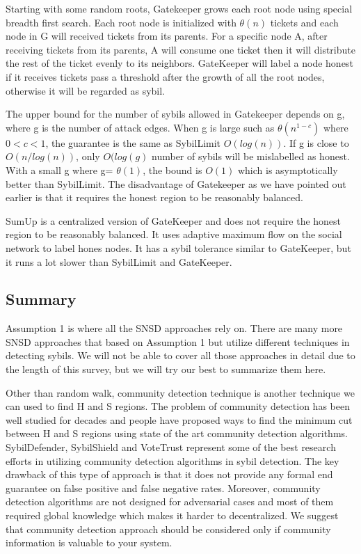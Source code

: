 \documentclass[conference]{IEEEtran}
\begin{document}
Starting with some random roots, Gatekeeper grows each root node using special breadth first search. Each root node is initialized with $\theta(n)$ tickets and each node in G will received tickets from its parents. For a specific node A, after receiving tickets from its parents, A will consume one ticket then it will distribute the rest of the ticket evenly to its neighbors. GateKeeper will label a node honest if it receives tickets pass a threshold after the growth of all the root nodes, otherwise it will be regarded as sybil.

The upper bound for the number of sybils allowed in Gatekeeper depends on g, where g is the number of attack edges. When g is large such as $\theta(n^{1-c})$ where $0<c<1$, the guarantee is the same as SybilLimit $O(log(n))$. If g is close to $O(n/log(n))$, only $O(log(g)$ number of sybils will be mislabelled as honest. With a small g where g= $\theta(1)$, the bound is $O(1)$  which is asymptotically better than SybilLimit. The disadvantage of Gatekeeper as we have pointed out earlier is that it requires the honest region to be reasonably balanced.

SumUp \cite{tran09voting} is a centralized version of GateKeeper and does not require the honest region to be reasonably balanced. It uses adaptive maximum flow on the social network to label hones nodes. It has a sybil tolerance similar to GateKeeper, but it runs a lot slower than SybilLimit and GateKeeper.

\subsection{Summary}
Assumption 1 is where all the SNSD approaches rely on. There are many more SNSD approaches that based on Assumption 1 but utilize different techniques in detecting sybils. We will not be able to cover all those approaches in detail due to the length of this survey, but we will try our best to summarize them here. 

Other than random walk, community detection technique is another technique we can used to find H and S regions. The problem of community detection has been well studied for decades and people have proposed ways to find the minimum cut between H and S regions using state of the art community detection algorithms. SybilDefender\cite{wei13sybildefender}, SybilShield\cite{shi13sybilshield} and VoteTrust\cite{xue13votetrust} represent some of the best research efforts in utilizing community detection algorithms in sybil detection. The key drawback of this type of approach is that it does not provide any formal end guarantee on false positive and false negative rates. Moreover, community detection algorithms are not designed for adversarial cases and most of them required global knowledge which makes it harder to decentralized. We suggest that community detection approach should be considered only if community information is valuable to your system.
\end{document}
